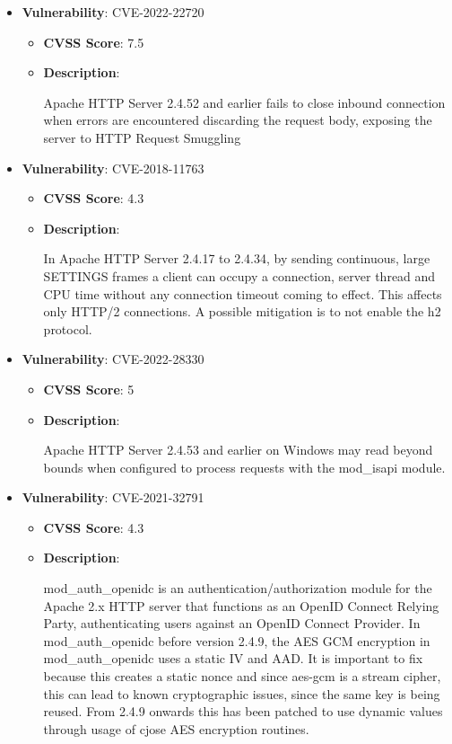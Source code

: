 \documentclass{article}
\begin{document}
\begin{itemize}
        \item \textbf{Vulnerability}: CVE-2022-22720
        \begin{itemize}
            \item \textbf{CVSS Score}:  7.5 
            \item \textbf{Description}:
            \parbox[t]{0.9\linewidth}{
                \ttfamily Apache HTTP Server 2.4.52 and earlier fails to close inbound connection when errors are encountered discarding the request body, exposing the server to HTTP Request Smuggling
            }
        \end{itemize}
    
        \item \textbf{Vulnerability}: CVE-2018-11763
        \begin{itemize}
            \item \textbf{CVSS Score}:  4.3 
            \item \textbf{Description}:
            \parbox[t]{0.9\linewidth}{
                \ttfamily In Apache HTTP Server 2.4.17 to 2.4.34, by sending continuous, large SETTINGS frames a client can occupy a connection, server thread and CPU time without any connection timeout coming to effect. This affects only HTTP/2 connections. A possible mitigation is to not enable the h2 protocol.
            }
        \end{itemize}
    
        \item \textbf{Vulnerability}: CVE-2022-28330
        \begin{itemize}
            \item \textbf{CVSS Score}:  5 
            \item \textbf{Description}:
            \parbox[t]{0.9\linewidth}{
                \ttfamily Apache HTTP Server 2.4.53 and earlier on Windows may read beyond bounds when configured to process requests with the mod\_isapi module.
            }
        \end{itemize}
    
        \item \textbf{Vulnerability}: CVE-2021-32791
        \begin{itemize}
            \item \textbf{CVSS Score}:  4.3 
            \item \textbf{Description}:
            \parbox[t]{0.9\linewidth}{
                \ttfamily mod\_auth\_openidc is an authentication/authorization module for the Apache 2.x HTTP server that functions as an OpenID Connect Relying Party, authenticating users against an OpenID Connect Provider. In mod\_auth\_openidc before version 2.4.9, the AES GCM encryption in mod\_auth\_openidc uses a static IV and AAD. It is important to fix because this creates a static nonce and since aes-gcm is a stream cipher, this can lead to known cryptographic issues, since the same key is being reused. From 2.4.9 onwards this has been patched to use dynamic values through usage of cjose AES encryption routines.
            }
        \end{itemize}
    

\end{itemize}
\end{document}
